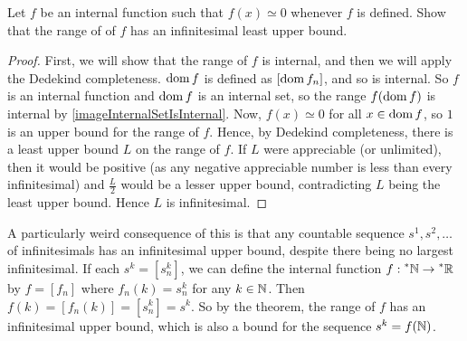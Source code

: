 \begin{thm}
    Let $f$ be an internal function such that $f(x) \simeq 0$ whenever $f$ is defined. Show that the range of of $f$ has an infinitesimal least upper bound.
\end{thm}

\begin{proof}
    First, we will show that the range of $f$ is internal, and then we will apply the Dedekind completeness. $\operatorname{dom} f$ is defined as $[\operatorname{dom} f_n]$, and so is internal. So $f$ is an internal function and $\operatorname{dom} f$ is an internal set, so the range $f(\operatorname{dom} f)$ is internal by \autoref{imageInternalSetIsInternal}. Now, $f(x) \simeq 0$ for all $x \in \operatorname{dom} f$, so $1$ is an upper bound for the range of $f$. Hence, by Dedekind completeness, there is a least upper bound $L$ on the range of $f$. If $L$ were appreciable (or unlimited), then it would be positive (as any negative appreciable number is less than every infinitesimal) and $\frac{L}{2}$ would be a lesser upper bound, contradicting $L$ being the least upper bound. Hence $L$ is infinitesimal.
\end{proof}

A particularly weird consequence of this is that any countable sequence $s^1, s^2, \ldots$ of infinitesimals has an infinitesimal upper bound, despite there being no largest infinitesimal. If each $s^k = [s^k_n]$, we can define the internal function $f: \prescript{*}{}{\mathbb{N}} \to \prescript{*}{}{\mathbb{R}}$ by $f = [f_n]$ where $f_n(k) = s^k_n$ for any $k \in \mathbb{N}$. Then $f(k) = [f_n(k)] = [s^k_n] = s^k$. So by the theorem, the range of $f$ has an infinitesimal upper bound, which is also a bound for the sequence $s^k = f(\mathbb{N})$. 

